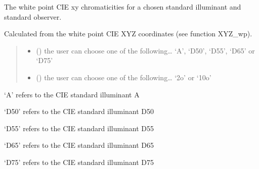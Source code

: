 \documentclass[letterpaper,10pt,english]{sphinxmanual}
\begin{document}

\begin{fulllineitems}
\label{\detokenize{07_colors:skinoptics.colors.xy_wp}}
\pysigstartsignatures
{}
\pysigstopsignatures
\begin{DUlineblock}{0em}
\item[] The white point CIE xy chromaticities for a chosen standard illuminant and standard observer.
\item[] Calculated from the white point CIE XYZ coordinates (see function XYZ\_wp).
\end{DUlineblock}
\begin{quote}\begin{description}
\begin{itemize}
\item {} 
\sphinxAtStartPar
{} () \textendash{} the user can choose one of the following… ‘A’, ‘D50’, ‘D55’, ‘D65’ or ‘D75’

\item {} 
\sphinxAtStartPar
{} () \textendash{} the user can choose one of the following… ‘2o’ or ‘10o’

\end{itemize}

\end{description}\end{quote}

\begin{DUlineblock}{0em}
\item[] ‘A’ refers to the CIE standard illuminant A
\item[] ‘D50’ refers to the CIE standard illuminant D50
\item[] ‘D55’ refers to the CIE standard illuminant D55
\item[] ‘D65’ refers to the CIE standard illuminant D65
\item[] ‘D75’ refers to the CIE standard illuminant D75
\end{DUlineblock}


\end{fulllineitems}
\end{document}
